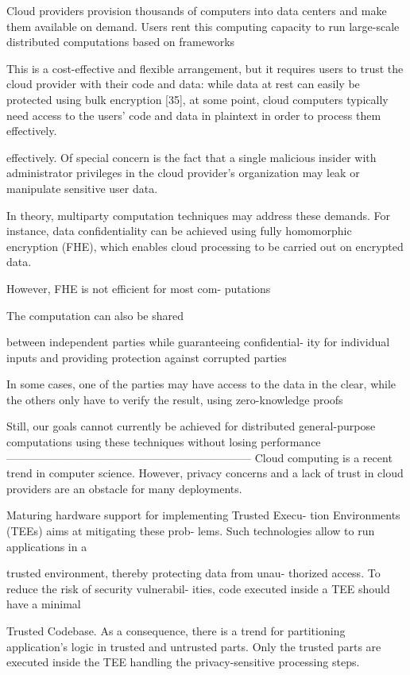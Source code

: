 Cloud providers provision thousands of computers into data
centers and make them available on demand. Users rent this
computing capacity to run large-scale distributed computations
based on frameworks

This is a
cost-effective and flexible arrangement, but it requires users to
trust the cloud provider with their code and data: while data
at rest can easily be protected using bulk encryption [35],
at some point, cloud computers typically need access to
the users’ code and data in plaintext in order to process
them effectively.

effectively. Of special concern is the fact that a single
malicious insider with administrator privileges in the cloud
provider’s organization may leak or manipulate sensitive user
data.

In theory, multiparty computation techniques may address
these demands. For instance, data confidentiality can be
achieved using fully homomorphic encryption (FHE), which
enables cloud processing to be carried out on encrypted data.

However, FHE is not efficient for most com-
putations

The computation can also be shared

between independent parties while guaranteeing confidential-
ity for individual inputs and providing protection against corrupted parties

In some cases, one of the parties may have
access to the data in the clear, while the others only have
to verify the result, using zero-knowledge proofs

Still, our goals
cannot currently be achieved for distributed general-purpose
computations using these techniques without losing performance
------------------------------------------------------------------
Cloud computing is a recent trend in computer science.
However, privacy concerns and a lack of trust in cloud
providers are an obstacle for many deployments.

Maturing hardware support for implementing Trusted Execu-
tion Environments (TEEs) aims at mitigating these prob-
lems. Such technologies allow to run applications in a

trusted environment, thereby protecting data from unau-
thorized access. To reduce the risk of security vulnerabil-
ities, code executed inside a TEE should have a minimal

Trusted Codebase. As a consequence, there is a trend for
partitioning application’s logic in trusted and untrusted
parts. Only the trusted parts are executed inside the TEE
handling the privacy-sensitive processing steps.

